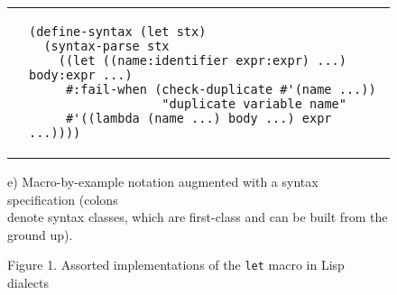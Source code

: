 \documentclass[10pt,journal,a4paper]{IEEEtran}
\begin{document}
\begin{figure*}[t]
\begin{listing}
\begin{tabular}{p{2.5cm} p{14.5cm}}\\
 &
\begin{verbatim}
(define-syntax (let stx)
  (syntax-parse stx
    ((let ((name:identifier expr:expr) ...) body:expr ...)
     #:fail-when (check-duplicate #'(name ...))
                  "duplicate variable name"
     #'((lambda (name ...) body ...) expr ...))))
\end{verbatim}
\end{tabular}

\begin{adjustwidth}{3.2cm}{0pt}
e) Macro-by-example notation augmented with a syntax specification \cite{culpepper10}
(colons \\denote syntax classes, which are first-class and can be built from the ground up).
\end{adjustwidth}
\end{listing}
\end{figure*}

\begin{figure*}
\hskip3.95cm
\normalsize Figure 1. Assorted implementations of the \small \texttt{let} \normalsize macro in Lisp dialects
\end{figure*}
\end{document}
